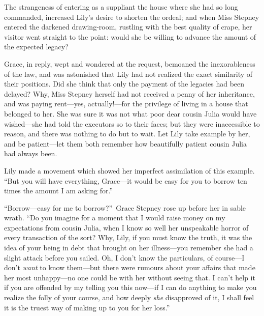 \documentclass[12pt,a4paper]{book}
\begin{document}
The strangeness of entering as a suppliant the house where she
had so long commanded, increased Lily's desire to shorten the
ordeal; and when Miss Stepney entered the darkened drawing-room,
rustling with the best quality of crape, her visitor went
straight to the point: would she be willing to advance the amount
of the expected legacy?





Grace, in reply, wept and wondered at the request, bemoaned the
inexorableness of the law, and was astonished that Lily had not
realized the exact similarity of their positions. Did she think
that only the payment of the legacies had been delayed? Why, Miss
Stepney herself had not received a penny of her inheritance, and
was paying rent---yes, actually!---for the privilege of living in a
house that belonged to her. She was sure it was not what poor
dear cousin Julia would have wished---she had told the executors
so to their faces; but they were inaccessible to reason, and
there was nothing to do but to wait. Let Lily take example by
her, and be patient---let them both remember how
beautifully patient cousin Julia had always been.





Lily made a movement which showed her imperfect assimilation of
this example. ``But you will have everything, Grace---it would be
easy for you to borrow ten times the amount I am asking for.''





``Borrow---easy for me to borrow?''\ Grace Stepney rose up before her
in sable wrath. ``Do you imagine for a moment that I would raise
money on my expectations from cousin Julia, when I know so well
her unspeakable horror of every transaction of the sort? Why,
Lily, if you must know the truth, it was the idea of your being
in debt that brought on her illness---you remember she had a
slight attack before you sailed. Oh, I don't know the
particulars, of course---I don't \textit{want} to know them---but there were
rumours about your affairs that made her most unhappy---no one
could be with her without seeing that. I can't help it if you are
offended by my telling you this now---if I can do anything to make
you realize the folly of your course, and how deeply \textit{she}
disapproved of it, I shall feel it is the truest way of making up
to you for her loss.''
\end{document}
